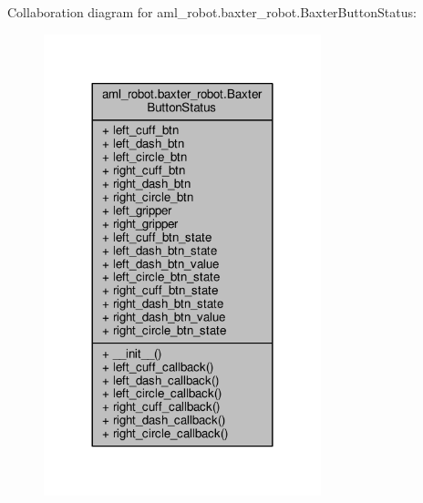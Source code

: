 Collaboration diagram for aml\-\_\-robot.\-baxter\-\_\-robot.\-Baxter\-Button\-Status\-:
\nopagebreak
\begin{figure}[H]
\begin{center}
\leavevmode
\includegraphics[width=228pt]{classaml__robot_1_1baxter__robot_1_1_baxter_button_status__coll__graph}
\end{center}
\end{figure}
